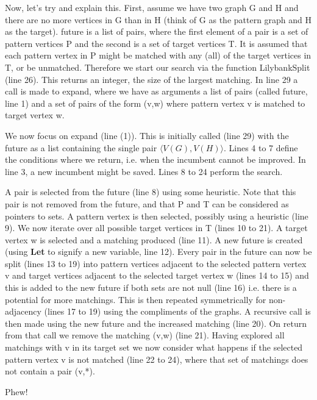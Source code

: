 \documentclass[letterpaper]{article}
\begin{document}
\noindent
Now, let's try and explain this. First, assume we have two graph G and H and there are no more vertices in G than in H (think of G as the pattern graph and H as the target).
future is a list of pairs, where the first element of a pair is a set of pattern vertices P and the second is a set of target vertices T. It is assumed that each pattern vertex in P 
might be matched with any (all) of the target vertices in T, or be unmatched. Therefore we start our search via the function LilybankSplit (line 26). This returns an integer, the size of the largest matching.
In line 29 a call is made to expand, where we have as arguments a list of pairs (called future, line 1) and a set of pairs of the form (v,w) where pattern vertex v is matched to target vertex w.

\bigskip
\noindent
We now focus on expand (line (1)). This is initially called (line 29) with the future as a list containing the single pair $\langle V(G),V(H) \rangle$. Lines 4 to 7 define the conditions 
where we return, i.e. when the incumbent cannot be improved. In line 3, a new incumbent might be saved. Lines 8 to 24 perform the search.

\bigskip
\noindent
A pair is selected from the future (line 8) using some heuristic. Note that this pair is not removed from the future, and that P and T can be considered as pointers to sets. A pattern vertex is then selected, possibly using a heuristic (line 9). We now iterate over all possible target vertices in T (lines 10 to 21). A target vertex w is selected and a matching produced (line 11). A new future is created (using {\bf Let} to signify a new variable, line 12). Every pair in the future can now be split (lines 13 to 19) into pattern vertices adjacent to the selected pattern vertex v and target vertices adjacent to the selected target vertex w (lines 14 to 15) and this is added to the new future if both sets are not null (line 16) i.e. there is a potential for more matchings. This is then repeated symmetrically for non-adjacency (lines 17 to 19) using the compliments of the graphs.
A recursive call is then made using the new future and the increased matching (line 20). On return from that call we remove the matching (v,w) (line 21). Having explored all matchings with v in its target set we now consider what happens if the selected pattern vertex v is not matched (line 22 to 24), where that set of matchings does not contain a pair (v,*).

\bigskip
\bigskip
\bigskip
\bigskip
\noindent
Phew!
\end{document}
